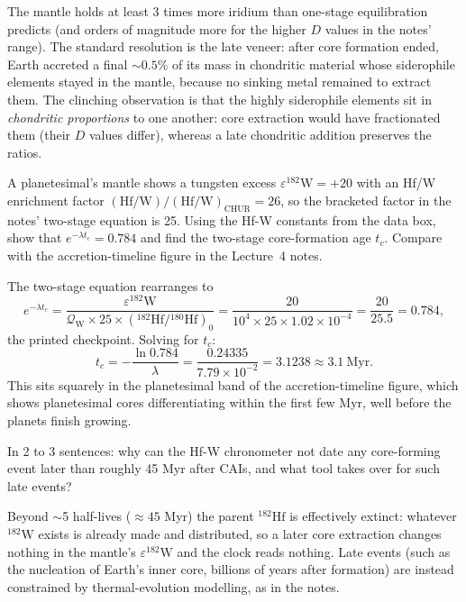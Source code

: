 \begin{solution}
The mantle holds at least 3 times more iridium than one-stage equilibration predicts
(and orders of magnitude more for the higher $D$ values in the notes' range).
The standard resolution is the late veneer: after core formation ended, Earth accreted a
final $\sim 0.5\%$ of its mass in chondritic material whose siderophile elements stayed in
the mantle, because no sinking metal remained to extract them. The clinching observation is
that the highly siderophile elements sit in \emph{chondritic proportions} to one another:
core extraction would have fractionated them (their $D$ values differ), whereas a late
chondritic addition preserves the ratios.
\end{solution}

\parti A planetesimal's mantle shows a tungsten excess $\varepsilon^{182}\mathrm{W} = +20$
with an Hf/W enrichment factor $(\mathrm{Hf}/\mathrm{W})/(\mathrm{Hf}/\mathrm{W})_\mathrm{CHUR} = 26$,
so the bracketed factor in the notes' two-stage equation is 25. Using the Hf-W constants from
the data box, show that $e^{-\lambda t_c} = 0.784$ and find the two-stage core-formation age
$t_c$. Compare with the accretion-timeline figure in the Lecture~4 notes.

\begin{solution}
The two-stage equation rearranges to
\[
  e^{-\lambda t_c} = \frac{\varepsilon^{182}\mathrm{W}}{\mathcal{Q}_\mathrm{W} \times 25 \times ({}^{182}\mathrm{Hf}/{}^{180}\mathrm{Hf})_0}
  = \frac{20}{10^{4} \times 25 \times 1.02 \times 10^{-4}}
  = \frac{20}{25.5} = 0.784,
\]
the printed checkpoint. Solving for $t_c$:
\[
  t_c = -\frac{\ln 0.784}{\lambda} = \frac{0.24335}{7.79 \times 10^{-2}} = 3.1238 \approx 3.1\ \mathrm{Myr}.
\]
This sits squarely in the planetesimal band of the accretion-timeline figure, which shows
planetesimal cores differentiating within the first few Myr, well before the planets finish
growing.
\end{solution}

\parti In 2 to 3 sentences: why can the Hf-W chronometer not date any core-forming event
later than roughly 45 Myr after CAIs, and what tool takes over for such late events?

\begin{solution}
Beyond $\sim$5 half-lives ($\approx 45$ Myr) the parent ${}^{182}\mathrm{Hf}$ is effectively
extinct: whatever ${}^{182}\mathrm{W}$ exists is already made and distributed, so a later
core extraction changes nothing in the mantle's $\varepsilon^{182}\mathrm{W}$ and the clock
reads nothing. Late events (such as the nucleation of Earth's inner core, billions of years
after formation) are instead constrained by thermal-evolution modelling, as in the notes.
\end{solution}


